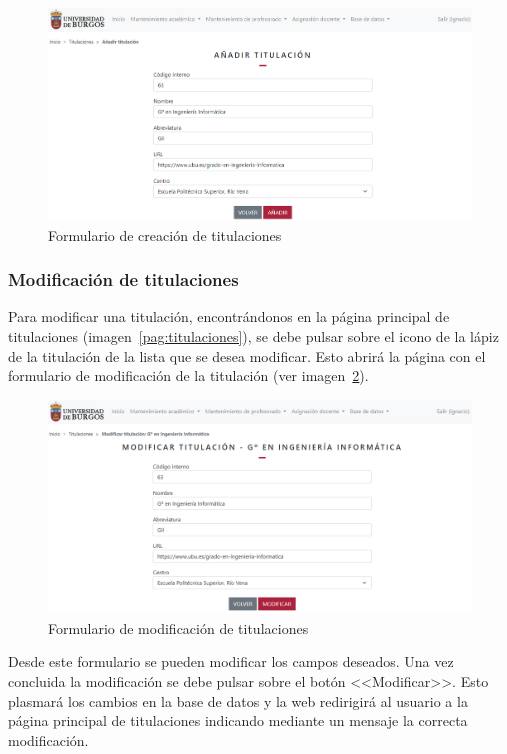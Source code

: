 \begin{figure}
	\centering
	\includegraphics[width=\textwidth]{../img/Anexos/Manual usuario/formTitulacion.png}
	\caption{Formulario de creación de titulaciones}\label{pag:formTitulacion}
\end{figure}

\subsubsection{Modificación de titulaciones}
Para modificar una titulación, encontrándonos en la página principal de titulaciones (imagen~\ref{pag:titulaciones}), se debe pulsar sobre el icono de la lápiz de la titulación de la lista que se desea modificar.
Esto abrirá la página con el formulario de modificación de la titulación (ver imagen~\ref{pag:formModTitulacion}).

\begin{figure}
	\centering
	\includegraphics[width=\textwidth]{../img/Anexos/Manual usuario/formModTitulacion.png}
	\caption{Formulario de modificación de titulaciones}\label{pag:formModTitulacion}
\end{figure}

Desde este formulario se pueden modificar los campos deseados.
Una vez concluida la modificación se debe pulsar sobre el botón <<Modificar>>.
Esto plasmará los cambios en la base de datos y la web redirigirá al usuario a la página principal de titulaciones indicando mediante un mensaje la correcta modificación.


